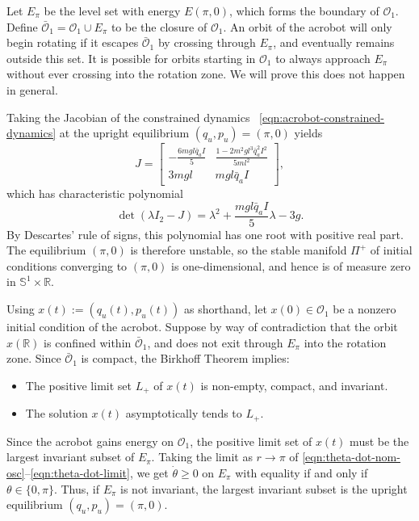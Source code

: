 \documentclass[journal,twoside,web, onecolumn, draftcls]{ieeecolor}
\newcommand*{\R}{\mathbb{R}}
\newcommand*{\Sone}{\mathbb{S}^1}
\newcommand*{\SxR}{\Sone \times \R}
\newcommand*{\Id}[1]{I_{#1}}
\begin{document}
Let \(E_\pi\) be the level set with energy \(E(\pi,0)\), 
which forms the boundary of \(\mathcal{O}_1\). 
Define \(\bar{\mathcal{O}}_1 = \mathcal{O}_1 \cup E_\pi\) to be the closure of
\(\mathcal{O}_1\).
An orbit of the acrobot will only begin rotating if it escapes
\(\bar{\mathcal{O}}_1\) by crossing through \(E_\pi\), and eventually remains
outside this set.
It is possible for orbits starting in \(\mathcal{O}_1\) to always approach
\(E_\pi\) without ever crossing into the rotation zone.
We will prove this does not happen in general.

Taking the Jacobian of the constrained dynamics
~\eqref{eqn:acrobot-constrained-dynamics} at the upright equilibrium 
\((q_u,p_u) = (\pi,0)\) yields
\[
    J = \begin{bmatrix}
        -\frac{6mgl\bar{q}_aI}{5} & \frac{1 - 2m^2gl^3\bar{q}_a^2 I^2}{5ml^2} \\
        3mgl & mgl\bar{q}_aI
    \end{bmatrix}
    ,
\]
which has characteristic polynomial
\[
    \det\left(\lambda \Id{2} - J\right)
    = \lambda^2 + \frac{mgl\bar{q}_a I}{5} \lambda - 3g
    .
\]
By Descartes' rule of signs, this polynomial has one root with positive real
part. 
The equilibrium \((\pi,0)\) is therefore unstable, so the stable manifold \(\Pi^+\) of
initial conditions converging to \((\pi,0)\) is one-dimensional, and hence is
of measure zero in \(\SxR\).

Using \(x(t) := (q_u(t),p_u(t))\) as shorthand, let
\(x(0) \in \mathcal{O}_1\) be a nonzero initial condition of the acrobot.
Suppose by way of contradiction that the orbit \(x(\R)\) is confined within 
\(\bar{\mathcal{O}}_1\), and does not exit through \(E_\pi\) into the rotation
zone.
Since \(\bar{\mathcal{O}}_1\) is compact, the Birkhoff Theorem \cite{birkhoff}
implies:
\begin{itemize}
    \item The positive limit set \(L_+\) of \(x(t)\) is non-empty, compact, and
        invariant.
    \item The solution \(x(t)\) asymptotically tends to \(L_+\).
\end{itemize}
Since the acrobot gains energy on \(\mathcal{O}_1\), the positive limit set of
\(x(t)\) must be the largest invariant subset of \(E_\pi\). 
Taking the limit as \(r \to \pi\) of
\eqref{eqn:theta-dot-nom-osc}--\eqref{eqn:theta-dot-limit},
we get \(\dot{\theta} \geq 0\) on \(E_\pi\) with equality if and only if
\(\theta \in \{0,\pi\}\).
Thus, if \(E_\pi\) is not invariant, the largest invariant subset is the upright
equilibrium \((q_u,p_u) = (\pi,0)\).
\end{document}
